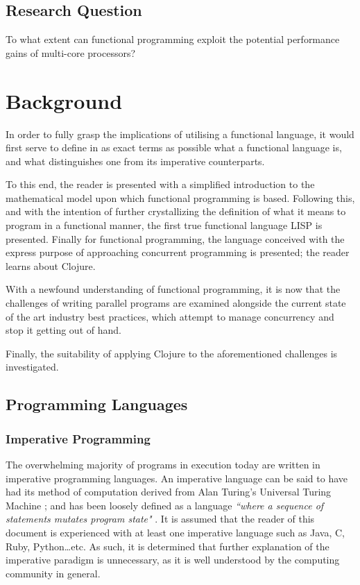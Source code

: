 \documentclass[12pt,a4paper]{article}
\begin{document}
\subsection{Research Question}

To what extent can functional programming exploit the potential performance gains of multi-core processors? 

\newpage
\section{Background}

In order to fully grasp the implications of utilising a functional language, it would first serve to define in as exact terms as possible what a functional language is, and what distinguishes one from its imperative counterparts. 

To this end, the reader is presented with a simplified introduction to the mathematical model upon which functional programming is based. Following this, and with the intention of further crystallizing the definition of what it means to program in a functional manner, the first true functional language LISP is presented. Finally for functional programming, the language conceived with the express purpose of approaching concurrent programming is presented; the reader learns about Clojure.

With a newfound understanding of functional programming, it is now that the challenges of writing parallel programs are examined alongside the current state of the art industry best practices, which attempt to manage concurrency and stop it getting out of hand.

Finally, the suitability of applying Clojure to the aforementioned challenges is investigated.

\subsection{Programming Languages}

\subsubsection{Imperative Programming}

The overwhelming majority of programs in execution today are written in imperative programming languages. An imperative language can be said to have had its method of computation derived from Alan Turing's Universal Turing Machine \cite{turing1936,ImperativeFunctional}; and has been loosely defined as a language \textit{``where a sequence of statements mutates program state"} \cite{joyOfClojure}. It is assumed that the reader of this document is experienced with at least one imperative language such as Java, C, Ruby, Python\ldots etc. As such, it is determined that further explanation of the imperative paradigm is unnecessary, as it is well understood by the computing community in general.
\end{document}
